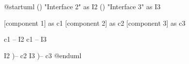 \documentclass{scrartcl}
\begin{document}
\begin{plantuml}
@startuml
() "Interface 2" as I2
() "Interface 3" as I3

[component 1] as c1
[component 2] as c2
[component 3] as c3

c1 -- I2
c1 -- I3

I2 )-- c2
I3 )-- c3
@enduml
\end{plantuml}
\end{document}
